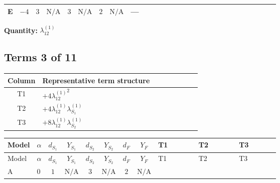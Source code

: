 \documentclass[8pt]{article}
\begin{document}
\begin{landscape}
\begin{longtable}{@{}llcccccc >{\raggedright\arraybackslash}p{0.21\linewidth} >{\raggedright\arraybackslash}p{0.21\linewidth} >{\raggedright\arraybackslash}p{0.21\linewidth}@{}}
\midrule
E & $-4$ & $3$ & $\text{N/A}$ & $3$ & $\text{N/A}$ & $2$ & $\text{N/A}$ & --- & \scriptsize\adjustbox{max width=\linewidth}{$\begin{gathered} -24 {g_2}^2 {\lambda_{12}^{(1)}}\end{gathered}$} & \scriptsize\adjustbox{max width=\linewidth}{$\begin{gathered} -30 {g_1}^2 {\lambda_{12}^{(1)}}\end{gathered}$} \\
\midrule
\bottomrule
\end{longtable}
\clearpage
\noindent\textbf{Quantity: }$\lambda_{12}^{(1)}$\par\smallskip
\subsection*{Terms 3 of 11}
\begin{center}
\begin{tabular}{@{}c >{\raggedright\arraybackslash}p{0.82\linewidth}@{}}
\toprule
Column & Representative term structure \\
\midrule
T1 & \(\displaystyle +4 {\lambda_{12}^{(1)}}^2\) \\
\midrule
T2 & \(\displaystyle +4 {\lambda_{12}^{(1)}} {\lambda_{S_1}^{(1)}}\) \\
\midrule
T3 & \(\displaystyle +8 {\lambda_{12}^{(1)}} {\lambda_{S_2}^{(1)}}\) \\
\midrule
\bottomrule
\end{tabular}
\end{center}
\smallskip
\tiny
\begin{longtable}{@{}llcccccc >{\raggedright\arraybackslash}p{0.21\linewidth} >{\raggedright\arraybackslash}p{0.21\linewidth} >{\raggedright\arraybackslash}p{0.21\linewidth}@{}}
\toprule
Model & $\alpha$ & $d_{S_1}$ & $Y_{S_1}$ & $d_{S_2}$ & $Y_{S_2}$ & $d_F$ & $Y_F$ & T1 & T2 & T3 \\
\midrule
\endfirsthead
\toprule
Model & $\alpha$ & $d_{S_1}$ & $Y_{S_1}$ & $d_{S_2}$ & $Y_{S_2}$ & $d_F$ & $Y_F$ & T1 & T2 & T3 \\
\midrule
\endhead
A & $0$ & $1$ & $\text{N/A}$ & $3$ & $\text{N/A}$ & $2$ & $\text{N/A}$ & \scriptsize\adjustbox{max width=\linewidth}{$\begin{gathered} +4 {\lambda_{12}^{(1)}}^2\end{gathered}$} & \scriptsize\adjustbox{max width=\linewidth}{$\begin{gathered} +4 {\lambda_{12}^{(1)}} {\lambda_{S_1}^{(1)}}\end{gathered}$} & \scriptsize\adjustbox{max width=\linewidth}{$\begin{gathered} +8 {\lambda_{12}^{(1)}} {\lambda_{S_2}^{(1)}}\end{gathered}$} \\

\end{longtable}
\end{landscape}
\end{document}
